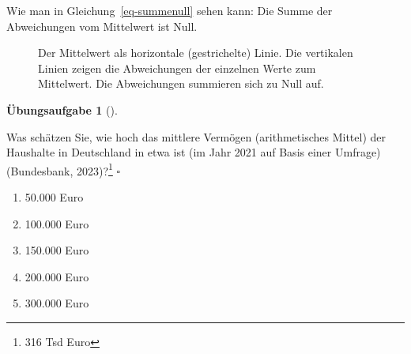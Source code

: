\documentclass[
  letterpaper,
  oneside,
  open=any]{scrbook}
\providecommand{\tightlist}{%
  \setlength{\itemsep}{0pt}\setlength{\parskip}{0pt}}\usepackage{longtable,booktabs,array}
\theoremstyle{definition}
\newtheorem{exercise}{Übungsaufgabe}[chapter]
\theoremstyle{definition}
\theoremstyle{definition}
\theoremstyle{remark}
\begin{document}
Wie man in Gleichung~\ref{eq-summenull} sehen kann: Die Summe der
Abweichungen vom Mittelwert ist Null.

\begin{figure}


\caption{\label{fig-mw1}Der Mittelwert als horizontale (gestrichelte)
Linie. Die vertikalen Linien zeigen die Abweichungen der einzelnen Werte
zum Mittelwert. Die Abweichungen summieren sich zu Null auf.}

\end{figure}%

\begin{exercise}[]\protect\hypertarget{exr-mw-wealth1}{}\label{exr-mw-wealth1}

Was schätzen Sie, wie hoch das mittlere Vermögen (arithmetisches Mittel)
der Haushalte in Deutschland in etwa ist (im Jahr 2021 auf Basis einer
Umfrage) (Bundesbank, 2023)?\footnote{316 Tsd Euro} \(\square\)

\begin{enumerate}
\def\labelenumi{\alph{enumi})}
\tightlist
\item
  50.000 Euro
\item
  100.000 Euro
\item
  150.000 Euro
\item
  200.000 Euro
\item
  300.000 Euro
\end{enumerate}

\end{exercise}
\end{document}
